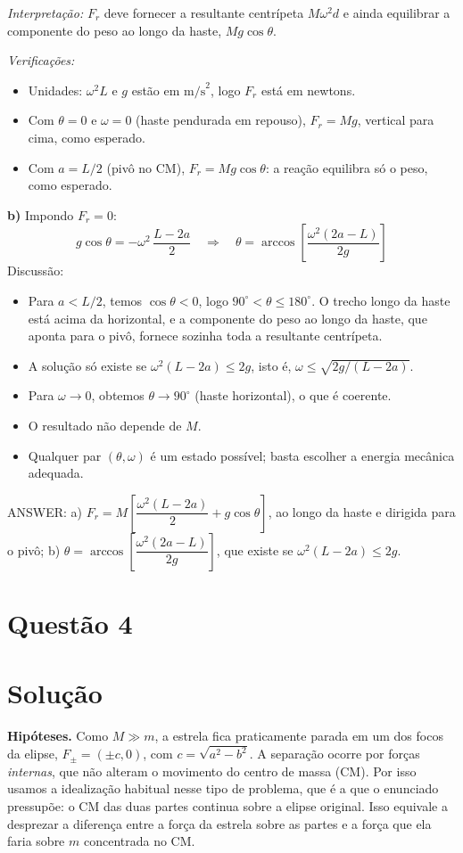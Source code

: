 \documentclass{article}%
\begin{document}
\textit{Interpretação:} $F_r$ deve fornecer a resultante centrípeta $M\omega^2 d$ e ainda equilibrar a componente do peso ao longo da haste, $Mg\cos\theta$.

\textit{Verificações:}
\begin{itemize}
\item Unidades: $\omega^2 L$ e $g$ estão em $\text{m/s}^2$, logo $F_r$ está em newtons.
\item Com $\theta=0$ e $\omega=0$ (haste pendurada em repouso), $F_r=Mg$, vertical para cima, como esperado.
\item Com $a=L/2$ (pivô no CM), $F_r=Mg\cos\theta$: a reação equilibra só o peso, como esperado.
\end{itemize}

\textbf{b)} Impondo $F_r=0$:
\[
g\cos\theta=-\omega^2\,\frac{L-2a}{2}
\quad\Longrightarrow\quad
\boxed{\theta=\arccos\!\left[\frac{\omega^2(2a-L)}{2g}\right]}
\]
Discussão:
\begin{itemize}
\item Para $a<L/2$, temos $\cos\theta<0$, logo $90^\circ<\theta\le180^\circ$. O trecho longo da haste está acima da horizontal, e a componente do peso ao longo da haste, que aponta para o pivô, fornece sozinha toda a resultante centrípeta.
\item A solução só existe se $\omega^2(L-2a)\le 2g$, isto é, $\omega\le\sqrt{2g/(L-2a)}$.
\item Para $\omega\to0$, obtemos $\theta\to90^\circ$ (haste horizontal), o que é coerente.
\item O resultado não depende de $M$.
\item Qualquer par $(\theta,\omega)$ é um estado possível; basta escolher a energia mecânica adequada.
\end{itemize}

\medskip
ANSWER: a) $F_r=M\left[\dfrac{\omega^2(L-2a)}{2}+g\cos\theta\right]$, ao longo da haste e dirigida para o pivô; b) $\theta=\arccos\!\left[\dfrac{\omega^2(2a-L)}{2g}\right]$, que existe se $\omega^2(L-2a)\le 2g$.%
\newpage%
\section*{Questão 4}

\section*{Solução}

\textbf{Hipóteses.} Como $M\gg m$, a estrela fica praticamente parada em um dos focos da elipse, $F_\pm=(\pm c,0)$, com $c=\sqrt{a^2-b^2}$. A separação ocorre por forças \emph{internas}, que não alteram o movimento do centro de massa (CM). Por isso usamos a idealização habitual nesse tipo de problema, que é a que o enunciado pressupõe: o CM das duas partes continua sobre a elipse original. Isso equivale a desprezar a diferença entre a força da estrela sobre as partes e a força que ela faria sobre $m$ concentrada no CM.
\end{document}
